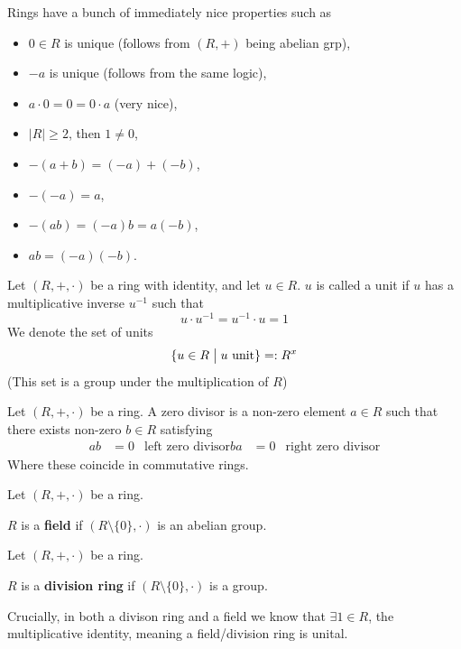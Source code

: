  Rings have a bunch of immediately nice properties such as 
 \begin{itemize}
    \item $0 \in R$ is unique (follows from $(R,+)$ 
        being abelian grp),
    \item $-a$ is unique (follows from the same logic),
    \item $a \cdot 0 = 0 = 0 \cdot a$ (very nice), 
    \item $|R| \geq 2$, then $1 \neq 0$, 
    \item $-(a+b) = (-a) + (-b)$, 
    \item $-(-a) = a$, 
    \item $-(ab) = (-a)b = a(-b)$, 
    \item $ab = (-a)(-b)$.
 \end{itemize}
 
 \begin{defn}[Unit]
     Let $(R,+,\cdot)$ be a ring with identity, and let $u \in R$. 
     $u$ is called a unit if $u$ has a multiplicative inverse 
     $u^{-1}$ such that 
     \[
         u \cdot u^{-1} = u^{-1} \cdot u = 1
     \]
     We denote the set of units 
     \[
         \{u \in R \bigm| u \ \text{unit}\} =: R^x
     \]
     (This set is a group under the multiplication of $R$)
 \end{defn}

 \newpage 
 \begin{defn}
    Let $(R,+,\cdot)$ be a ring. A zero divisor is a non-zero 
    element $a \in R$ such that there exists non-zero 
    $b \in R$ satisfying 
    \begin{align*}
        ab &= 0 & \text{left zero divisor}
        ba &= 0 & \text{right zero divisor}
    \end{align*}
    Where these coincide in commutative rings. 
 \end{defn}
 \begin{defn}[Field]
     Let $(R,+,\cdot)$ be a ring. 

     $R$ is a \textbf{field} if 
     $(R\setminus \{0\}, \cdot)$ is an abelian group. 
 \end{defn}
 \begin{defn}
     Let $(R,+,\cdot)$ be a ring.  

     $R$ is a \textbf{division ring} if $(R \setminus \{0\}, \cdot)$ 
     is a group.
 \end{defn}

 Crucially, in both a divison ring and a field we know that 
 $\exists 1 \in R$, the multiplicative identity, meaning 
 a field/division ring is unital. 

